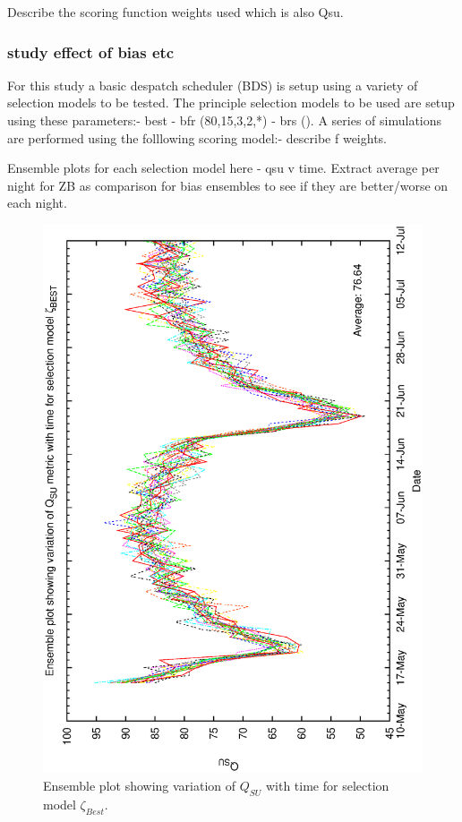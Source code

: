 Describe the scoring function weights used which is also Qsu.

\subsubsection{study effect of bias etc}
For this study a basic despatch scheduler (BDS) is setup using a variety of selection models to be tested.
The principle selection models to be used are setup using these parameters:-
best - bfr (80,15,3,2,*) - brs (). A series of simulations are performed using the folllowing scoring model:- describe f weights.

Ensemble plots for each selection model here - qsu v time. Extract average per night for ZB as comparison for bias ensembles to see if they are better/worse on each night.

\begin{figure}[h]

\begin{center}
 \includegraphics[scale=0.5, angle=-90]{figures/best_ensemble.eps}
 \caption[Ensemble plot showing variation of $Q_{SU}$ with time for selection model $\zeta_{Best}$.] 
   {Ensemble plot showing variation of $Q_{SU}$ with time for selection model $\zeta_{Best}$.}
\label{fig:ensemble_best}
\end{center} 
\end{figure}


